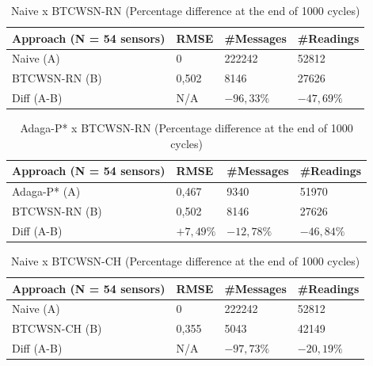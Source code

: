\documentclass[conference]{IEEEtran}
\begin{document}
\begin{table}[h!]
\caption{Naive x BTCWSN-RN (Percentage difference at the end of 1000 cycles)}
\begin{center}
\begin{tabular}{|l||l|l|l|}
\hline
Approach (N = 54 sensors) &RMSE &\#Messages &\#Readings \\
\hline\hline
Naive (A) &0 &222242 &52812 \\
\hline
BTCWSN-RN (B) &0,502 &8146 &27626 \\
\hline
Diff (A-B) &N/A &$-96,33\%$ &$-47,69\%$ \\
\hline
\end{tabular}
\end{center}
\end{table}

\begin{table}[h!]
\caption{Adaga-P* x BTCWSN-RN (Percentage difference at the end of 1000 cycles)}
\begin{center}
\begin{tabular}{|l||l|l|l|}
\hline
Approach (N = 54 sensors) &RMSE &\#Messages &\#Readings \\
\hline\hline
Adaga-P* (A) &0,467 &9340 &51970 \\
\hline
BTCWSN-RN (B) &0,502 &8146 &27626 \\
\hline
Diff (A-B) &$+7,49\%$ &$-12,78\%$ &$-46,84\%$ \\
\hline
\end{tabular}
\end{center}
\end{table}

\begin{table}[h!]
\caption{Naive x BTCWSN-CH (Percentage difference at the end of 1000 cycles)}
\begin{center}
\begin{tabular}{|l||l|l|l|}
\hline
Approach (N = 54 sensors) &RMSE &\#Messages &\#Readings \\
\hline\hline
Naive (A) &0 &222242 &52812 \\
\hline
BTCWSN-CH (B) &0,355 &5043 &42149 \\
\hline
Diff (A-B) &N/A &$-97,73\%$ &$-20,19\%$ \\
\hline
\end{tabular}
\end{center}
\end{table}
\end{document}

